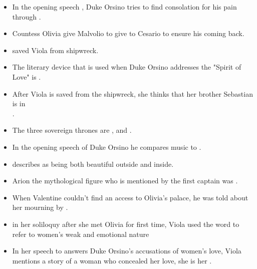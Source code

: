 \documentclass[12pt, a4paper]{article}
\begin{document}
\begin{itemize}

  \item[\ding{109}] In the opening speech , Duke Orsino tries to find consolation for his pain through .

  \item[\ding{109}] Countess Olivia give Malvolio  to give to Cesario to ensure his coming back.

  \item[\ding{109}]  saved Viola from shipwreck.

  \item[\ding{109}] The literary device that is used when Duke Orsino addresses the "Spirit of Love" is .

  \item[\ding{109}] After Viola is saved from the shipwreck, she thinks that her brother Sebastian is in  \\ 
    .

  \item[\ding{109}] The three sovereign thrones are ,  and .

  \item[\ding{109}] In the opening speech of Duke Orsino he compares music to .

  \item[\ding{109}]  describes  as being both beautiful outside and inside.

  \item[\ding{109}] Arion the mythological figure who is mentioned by the first captain was .

  \item[\ding{109}] When Valentine couldn't find an access to Olivia's palace, he was told about her mourning by .

  \item[\ding{109}] in her soliloquy after she met Olivia for first time, Viola used the word   to refer to women's weak and emotional nature

  \item[\ding{109}] In her speech to answers Duke Orsino's accusations of women's love, Viola mentions 
    a story of a woman who concealed her love, she is her .


\end{itemize}
\end{document}
